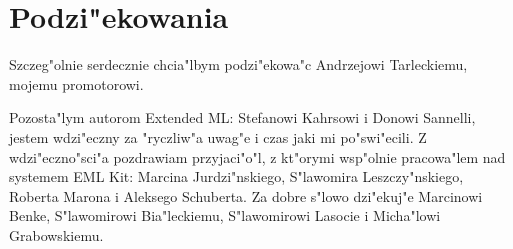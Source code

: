 \section*{Podzi"ekowania}

Szczeg"olnie serdecznie chcia"lbym podzi"ekowa"c Andrzejowi Tarleckiemu, mojemu promotorowi.

Pozosta"lym autorom Extended ML: Stefanowi Kahrsowi i Donowi Sannelli, jestem wdzi"eczny
za "ryczliw"a uwag"e i czas jaki mi po"swi"ecili.
Z wdzi"e\-czno\-"sci"a pozdrawiam przyjaci"o"l, z kt"orymi wsp"olnie pracowa"lem nad systemem EML Kit:
Marcina Jurdzi"nskiego, S"lawomira Leszczy"nskiego, Roberta Marona i Aleksego Schuberta. 
Za dobre s"lowo dzi"ekuj"e Marcinowi Benke, S"lawomirowi Bia\-"le\-ckie\-mu,
S"lawomirowi Lasocie i Micha"lowi Grabowskiemu.


